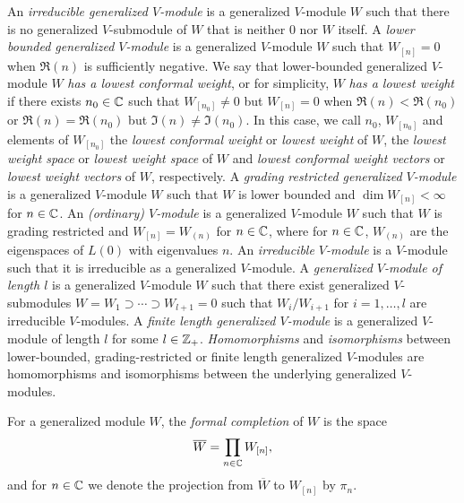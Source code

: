 \documentclass[12pt]{article}
\begin{document}
\begin{defn}
{\rm An {\it irreducible generalized $V$-module} is a generalized $V$-module $W$
such that there is no generalized $V$-submodule of $W$ that is neither
$0$ nor $W$ itself.  A {\it lower bounded generalized $V$-module} is 
a generalized $V$-module $W$ such that $W_{[n]}=0$ when $\Re{(n)}$ is sufficiently negative.
We say that lower-bounded generalized $V$-module $W$ 
{\it has a lowest conformal weight}, or for simplicity, $W$ {\it has a lowest weight}
if there exists $n_{0}\in \mathbb{C}$ such that
$W_{[n_{0}]}\ne 0$ but $W_{[n]}=0$ when $\Re{(n)}<\Re{(n_{0})}$
or $\Re{(n)}=\Re{(n_{0})}$ but $\Im{(n)}\ne \Im{(n_{0})}$. In this case,
we call $n_{0}$, $W_{[n_{0}]}$ and elements of $W_{[n_{0}]}$
the {\it lowest conformal weight} or {\it lowest
weight} of $W$, the {\it lowest weight space}
or {\it lowest weight space}
of $W$ and {\it lowest
conformal weight
vectors} or {\it lowest weight vectors} of $W$, respectively.
A {\it grading restricted generalized $V$-module}  is a generalized $V$-module $W$
such that $W$
is lower bounded
and $\dim W_{[n]}<\infty$
for $n\in \mathbb{C}$.
An {\it (ordinary) $V$-module} is a generalized $V$-module $W$ 
such that $W$ is grading restricted and
$W_{[n]}=W_{(n)}$ for $n\in \mathbb{C}$, where for $n\in \mathbb{C}$, $W_{(n)}$
are the eigenspaces of $L(0)$ with eigenvalues $n$. An {\it irreducible $V$-module}
is a $V$-module such that 
it is irreducible as a generalized $V$-module. 
A {\it generalized $V$-module of length $l$}
is a generalized $V$-module $W$ such that there exist
generalized $V$-submodules $W=W_{1}\supset \cdots
\supset W_{l+1}=0$ such that $W_{i}/W_{i+1}$ for $i=1, \dots, l$
are irreducible $V$-modules.
A {\it finite length generalized $V$-module} is a generalized $V$-module
of length  $l$ for some $l\in \mathbb{Z}_{+}$.
{\it Homomorphisms} and {\it isomorphisms}
between lower-bounded, 
grading-restricted or finite length generalized $V$-modules are
homomorphisms and isomorphisms between the underlying
generalized $V$-modules.

For a generalized module $W$, the \emph{formal completion} of $W$ is the space 
$$\overline W = \prod_{n\in \mathbb{C}} W_{[n]},$$
and for $n\in \mathbb{C}$ we denote the projection from $\overline W$
to $W_{[n]}$ by $\pi_n$.}
\end{defn}
\end{document}
